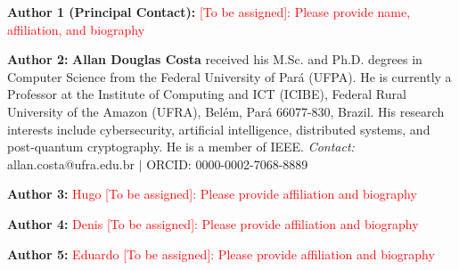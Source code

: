 \documentclass[conference,10pt,twocolumn]{IEEEtran}
\begin{document}

\noindent\textbf{Author 1 (Principal Contact):} \textcolor{red}{[To be assigned]: Please provide name, affiliation, and biography}

\noindent\textbf{Author 2:} \textbf{Allan Douglas Costa} received his M.Sc. and Ph.D. degrees in Computer Science from the Federal University of Pará (UFPA). He is currently a Professor at the Institute of Computing and ICT (ICIBE), Federal Rural University of the Amazon (UFRA), Belém, Pará 66077-830, Brazil. His research interests include cybersecurity, artificial intelligence, distributed systems, and post-quantum cryptography. He is a member of IEEE. \textit{Contact:} allan.costa@ufra.edu.br $|$ ORCID: 0000-0002-7068-8889

\noindent\textbf{Author 3:} \textcolor{red}{Hugo [To be assigned]: Please provide affiliation and biography}

\noindent\textbf{Author 4:} \textcolor{red}{Denis [To be assigned]: Please provide affiliation and biography}

\noindent\textbf{Author 5:} \textcolor{red}{Eduardo [To be assigned]: Please provide affiliation and biography}



\end{document}
